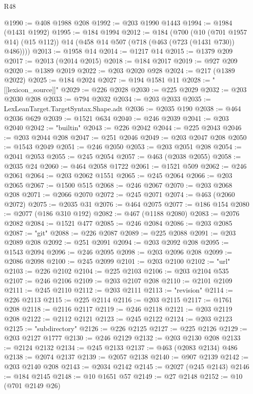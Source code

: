 \begin{lexlean}{R48}
\begin{coremodule}
@1990 := @408 @1988 @208
@1992 := @203 @1990 @1443
@1994 := @1984 (@1431 @1992)
@1995 := @184 @1994
@2012 := @184
    (@700
      (@10 (@701 @1957 @14) (@15 @112))
      @14
      (@458 @14 @507 (@718 (@463 (@723 (@1431 @730)) @486))))
@2013 := @1958 @14
@2014 := @1217 @14
@2015 := @1379 @209
@2017 := @2013 (@2014 @2015)
@2018 := @184 @2017
@2019 := @927 @209
@2020 := @1389 @2019
@2022 := @203 @2020 @928
@2024 := @217 (@1389 @2022)
@2025 := @184 @2024
@2027 := @194 @1581 @11
@2028 := "[[lexicon_source]]"
@2029 := @226 @2028
@2030 := @225 @2029
@2032 := @203 @2030 @208
@2033 := @794 @2032
@2034 := @203 @2033
@2035 := LexLeanTarget.TargetSyntax.Shape.adt
@2036 := @2035 @190
@2038 := @464 @2036 @629
@2039 := @1521 @634
@2040 := @246 @2039
@2041 := @203 @2040
@2042 := "builtin"
@2043 := @226 @2042
@2044 := @225 @2043
@2046 := @203 @2044 @208
@2047 := @251 @2046
@2049 := @203 @2047 @208
@2050 := @1543 @2049
@2051 := @246 @2050
@2053 := @203 @2051 @208
@2054 := @2041 @2053
@2055 := @245 @2054
@2057 := @463 (@2038 @2055)
@2058 := @2035 @24
@2060 := @464 @2058 @1722
@2061 := @1521 @509
@2062 := @246 @2061
@2064 := @203 @2062 @1551
@2065 := @245 @2064
@2066 := @203 @2065
@2067 := @1500 @515
@2068 := @246 @2067
@2070 := @203 @2068 @208
@2071 := @2066 @2070
@2072 := @245 @2071
@2074 := @463 (@2060 @2072)
@2075 := @2035 @31
@2076 := @464 @2075
@2077 := @186 @154
@2080 := @2077 (@186 @310 @192)
@2082 := @467 (@1188 @2080)
@2083 := @2076 @2082
@2084 := @1521 @477
@2085 := @246 @2084
@2086 := @203 @2085
@2087 := "git"
@2088 := @226 @2087
@2089 := @225 @2088
@2091 := @203 @2089 @208
@2092 := @251 @2091
@2094 := @203 @2092 @208
@2095 := @1543 @2094
@2096 := @246 @2095
@2098 := @203 @2096 @208
@2099 := @2086 @2098
@2100 := @245 @2099
@2101 := @203 @2100
@2102 := "url"
@2103 := @226 @2102
@2104 := @225 @2103
@2106 := @203 @2104 @535
@2107 := @246 @2106
@2109 := @203 @2107 @208
@2110 := @2101 @2109
@2111 := @245 @2110
@2112 := @203 @2111
@2113 := "revision"
@2114 := @226 @2113
@2115 := @225 @2114
@2116 := @203 @2115
@2117 := @1761 @208
@2118 := @2116 @2117
@2119 := @246 @2118
@2121 := @203 @2119 @208
@2122 := @2112 @2121
@2123 := @245 @2122
@2124 := @203 @2123
@2125 := "subdirectory"
@2126 := @226 @2125
@2127 := @225 @2126
@2129 := @203 @2127 @1777
@2130 := @246 @2129
@2132 := @203 @2130 @208
@2133 := @2124 @2132
@2134 := @245 @2133
@2137 := @463 (@2083 @2134) @486
@2138 := @2074 @2137
@2139 := @2057 @2138
@2140 := @907 @2139
@2142 := @203 @2140 @208
@2143 := @2034 @2142
@2145 := @2027 (@245 @2143)
@2146 := @184 @2145
@2148 := @10 @1651 @57
@2149 := @27 @2148
@2152 := @10 (@701 @2149 @26)

\end{coremodule}
\end{lexlean}
